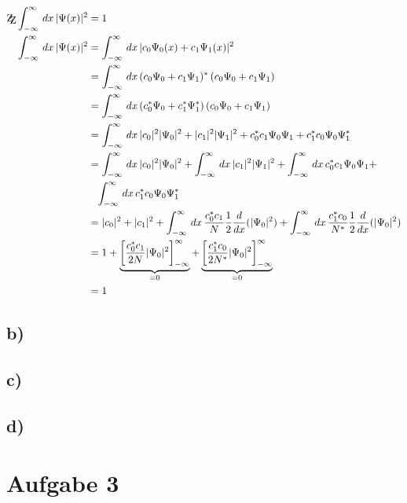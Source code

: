 \begin{align*}
    \mathrm{Z\kern-.3em\raise-0.5ex\hbox{Z}} \int_{-\infty}^{\infty} \, dx \, \abs{\Psi (x)}^2&=1\\
    \int_{-\infty}^{\infty} \, dx\, \abs{\Psi (x)}^2 &= \int_{-\infty}^{\infty}\, dx\, \abs{c_0 \Psi _0 (x) + c_1 \Psi _1(x)}^2\\
    &=\int_{-\infty}^{\infty} \, dx\, (c_0 \Psi _0  + c_1 \Psi _1)^* \,(c_0 \Psi _0  + c_1 \Psi _1)\\
    &=\int_{-\infty}^{\infty} \, dx\, (c_0^* \Psi _0  + c_1^* \Psi _1^*) \,(c_0 \Psi _0  + c_1 \Psi _1)\\
    &=\int_{-\infty}^{\infty} \, dx\, \abs{c_0}^2 \abs{\Psi _0}^2+\abs{c_1}^2 \abs{\Psi _1}^2 + c_0^* c_1 \Psi _0 \Psi _1+c_1^* c_0 \Psi _0 \Psi_1^*\\
    &=\int_{-\infty}^{\infty} \, dx\, \abs{c_0}^2 \abs{\Psi _0}^2 +\int_{-\infty}^{\infty} \, dx\,\abs{c_1}^2 \abs{\Psi _1}^2 +\int_{-\infty}^{\infty} \, dx\, c_0^* c_1 \Psi _0 \Psi _1+ \\
    &\phantom{=} \int_{-\infty}^{\infty} \, dx\, c_1^* c_0 \Psi _0 \Psi_1^*\\
    &= \abs{c_0}^2+\abs{c_1}^2+ \int_{-\infty}^ {\infty}\,dx\, \frac{c_0^*c_1}{N}\frac{1}{2} \frac{d}{dx}(\abs{\Psi _0}^2)+ \int_{-\infty}^{\infty} \,dx\, \frac{c_1^*c_0}{N^*}\frac{1}{2}\frac{d}{dx}(\abs{\Psi _0}^2) \\
    &= 1+ \underbrace{\left[\frac{c_0^*c_1}{2N}\abs{\Psi _0}^2\right]_{-\infty}^{\infty}}_{=0} + \underbrace{\left[\frac{c_1^*c_0}{2N^*}\abs{\Psi _0}^2 \right]_{-\infty}^{\infty}}_{=0} \\
    &=1
\end{align*}

\subsection{b)}



\subsection{c)}



\subsection{d)}



\section{Aufgabe 3}

